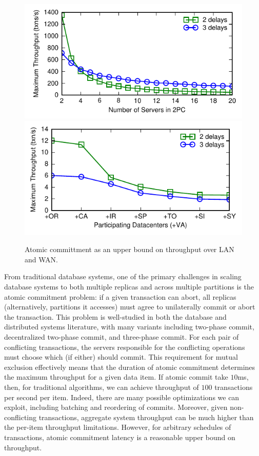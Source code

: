 \begin{figure}
\begin{center}
\includegraphics[width=\columnwidth]{figs/singledc-twopc.pdf}
\includegraphics[width=\columnwidth]{figs/multidc-twopc.pdf}
\end{center}
\caption{Atomic committment as an upper bound on throughput over LAN
  and WAN.}
\label{fig:2pc}
\end{figure}

From traditional database systems, one of the primary challenges in
scaling database systems to both multiple replicas and across multiple
partitions is the atomic commitment problem: if a given transaction
can abort, all replicas (alternatively, partitions it accesses) must
agree to unilaterally commit or abort the transaction. This problem is
well-studied in both the database and distributed systems literature,
with many variants including two-phase commit, decentralized two-phase
commit, and three-phase commit. For each pair of conflicting
transactions, the servers responsible for the conflicting operations
must choose which (if either) should commit. This requirement for
mutual exclusion effectively means that the duration of atomic
commitment determines the maximum throughput for a given data item. If
atomic commit take $10$ms, then, for traditional algorithms, we can
achieve throughput of $100$ transactions per second per item. Indeed,
there are many possible optimizations we can exploit, including
batching and reordering of commits. Moreover, given non-conflicting
transactions, aggregate system throughput can be much higher than the
per-item throughput limitations. However, for arbitrary schedules of
transactions, atomic commitment latency is a reasonable upper bound on
throughput.

